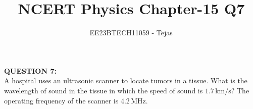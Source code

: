 \documentclass[journal,12pt,twocolumn]{IEEEtran}
\theoremstyle{remark}
\begin{document}


\vspace{3cm}

\title{NCERT Physics Chapter-15 Q7}
\author{EE23BTECH11059 - Tejas$^{}$}
\maketitle

\newpage

\Huge \textbf{QUESTION 7:} \\

\medskip
\Large
A hospital uses an ultrasonic scanner to locate tumors in a tissue. What is the
wavelength of sound in the tissue in which the speed of sound is $1.7 \, \text{km/s}$? The operating frequency of the scanner is $4.2 \, \text{MHz}$.
\end{document}
